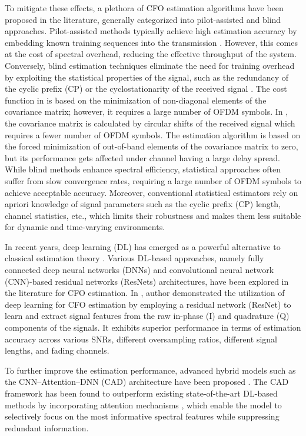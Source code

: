 \documentclass[10pt, journal]{IEEEtran}
\begin{document}
To mitigate these effects, a plethora of CFO estimation algorithms have been proposed in the literature, generally categorized into pilot-assisted and blind approaches. Pilot-assisted methods typically achieve high estimation accuracy by embedding known training sequences into the transmission \cite{ninkovic2021deep}. However, this comes at the cost of spectral overhead, reducing the effective throughput of the system. Conversely, blind estimation techniques eliminate the need for training overhead by exploiting the statistical properties of the signal, such as the redundancy of the cyclic prefix (CP) or the cyclostationarity of the received signal \cite{vandebeek1997ml, roman2006blind}. The cost function in \cite{roman2006blind} is based on the minimization of non-diagonal elements of the covariance matrix; however, it requires a large number of OFDM symbols. In \cite{cfo_oh_2011}, the covariance matrix is calculated by circular shifts of the received signal which requires a fewer number of OFDM symbols. The estimation algorithm is based on the forced minimization of out-of-band elements of the covariance matrix to zero, but its performance gets affected under channel having a large delay spread. While blind methods enhance spectral efficiency, statistical approaches often suffer from slow convergence rates, requiring a large number of OFDM symbols to achieve acceptable accuracy. Moreover, conventional statistical estimators rely on apriori knowledge of signal parameters such as the cyclic prefix (CP) length, channel statistics, etc., which limits their robustness and makes them less suitable for dynamic and time-varying environments.

In recent years, deep learning (DL) has emerged as a powerful alternative to classical estimation theory \cite{oshea2017introduction}. Various DL-based approaches, namely fully connected deep neural networks (DNNs) and convolutional neural network (CNN)-based residual networks (ResNets) architectures, have been explored in the literature for CFO estimation. In \cite{chen_cfo_dl_2024}, author demonstrated the utilization of deep learning for CFO estimation by employing a residual network (ResNet) to learn and extract signal features from the raw in-phase (I) and quadrature (Q) components of the signals. It exhibits superior performance in terms of estimation accuracy across various SNRs, different oversampling ratios, different signal lengths, and fading channels.

To further improve the estimation performance, advanced hybrid models such as the CNN–Attention–DNN (CAD) architecture have been proposed \cite{chaudhari2023_cad}. The CAD framework has been found to outperform existing state-of-the-art DL-based methods by incorporating attention mechanisms \cite{bahdanau2014neural}, which enable the model to selectively focus on the most informative spectral features while suppressing redundant information. 
\end{document}

